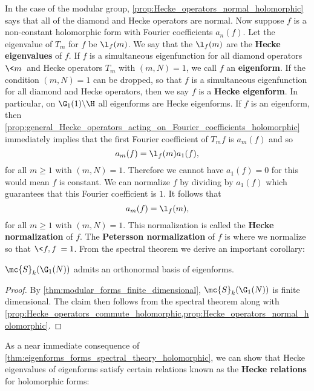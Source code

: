     In the case of the modular group, \cref{prop:Hecke_operators_normal_holomorphic} says that all of the diamond and Hecke operators are normal. Now suppose $f$ is a non-constant holomorphic form with Fourier coefficients $a_{n}(f)$. Let the eigenvalue of $T_{m}$ for $f$ be $\l_{f}(m)$. We say that the $\l_{f}(m)$ are the \textbf{Hecke eigenvalues} of $f$. If $f$ is a simultaneous eigenfunction for all diamond operators $\<m\>$ and Hecke operators $T_{m}$ with $(m,N) = 1$, we call $f$ an \textbf{eigenform}. If the condition $(m,N) = 1$ can be dropped, so that $f$ is a simultaneous eigenfunction for all diamond and Hecke operators, then we say $f$ is a \textbf{Hecke eigenform}. In particular, on $\G_{1}(1)\backslash\H$ all eigenforms are Hecke eigenforms. If $f$ is an eigenform, then \cref{prop:general_Hecke_operators_acting_on_Fourier_coefficients_holomorphic} immediately implies that the first Fourier coefficient of $T_{m}f$ is $a_{m}(f)$ and so
    \[
      a_{m}(f) = \l_{f}(m)a_{1}(f),
    \]
    for all $m \ge 1$ with $(m,N) = 1$. Therefore we cannot have $a_{1}(f) = 0$ for this would mean $f$ is constant. We can normalize $f$ by dividing by $a_{1}(f)$ which guarantees that this Fourier coefficient is $1$. It follows that
    \[
      a_{m}(f) = \l_{f}(m),
    \]
    for all $m \ge 1$ with $(m,N) = 1$. This normalization is called the \textbf{Hecke normalization} of $f$. The \textbf{Petersson normalization} of $f$ is where we normalize so that $\<f,f\> = 1$. From the spectral theorem we derive an important corollary:

    \begin{theorem}\label{thm:eigenforms_forms_spectral_theory_holomorphic}
      $\mc{S}_{k}(\G_{1}(N))$ admits an orthonormal basis of eigenforms.
    \end{theorem}
    \begin{proof}
      By \cref{thm:modular_forms_finite_dimensional}, $\mc{S}_{k}(\G_{1}(N))$ is finite dimensional. The claim then follows from the spectral theorem along with \cref{prop:Hecke_operators_commute_holomorphic,prop:Hecke_operators_normal_holomorphic}.
    \end{proof}

    As a near immediate consequence of \cref{thm:eigenforms_forms_spectral_theory_holomorphic}, we can show that Hecke eigenvalues of eigenforms satisfy certain relations known as the \textbf{Hecke relations} for holomorphic forms:

